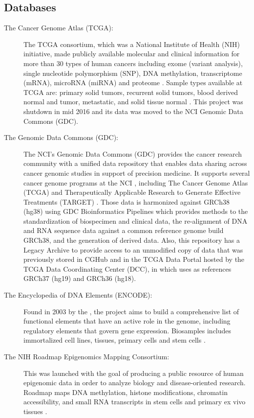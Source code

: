 \subsection{Databases} \label{susec:db}
\begin{description}
  \item [The Cancer Genome Atlas (TCGA):] The TCGA consortium, which was a National Institute of Health (NIH) initiative, made publicly available molecular and clinical information for more than 30 types of human cancers including exome (variant analysis), single nucleotide polymorphism (SNP), DNA methylation, transcriptome (mRNA), microRNA (miRNA) and proteome . Sample types available at TCGA are: primary solid tumors, recurrent solid tumors, blood derived normal and tumor, metastatic, and solid tissue normal \cite{weinstein2013cancer}. This project was shutdown in mid 2016 and its data was moved to  the NCI Genomic Data Commons (GDC).
  \item [The Genomic Data Commons (GDC):]  The NCI's Genomic Data Commons (GDC) provides the cancer research community with a unified data repository that enables data sharing across cancer genomic studies in support of precision medicine.
  It supports several cancer genome programs at the NCI , including The Cancer Genome Atlas (TCGA) and Therapeutically Applicable Research to Generate Effective Treatments (TARGET) \cite{GDC_web}.
  Those data is harmonized against GRCh38 (hg38) using GDC Bioinformatics Pipelines which provides methods to the standardization of biospecimen and clinical data, the re-alignment of DNA and RNA sequence data against a common reference genome build GRCh38, and the generation of derived data. Also, this repository has a Legacy Archive to provide access to an unmodified copy of data that was previously stored in CGHub \cite{wilks2014cancer} and in the TCGA Data Portal hosted by the TCGA Data Coordinating Center (DCC), in which uses as references GRCh37 (hg19) and GRCh36 (hg18).
  \item [The Encyclopedia of DNA Elements (ENCODE):] Found in 2003 by the , the project aims to build a comprehensive list of functional elements that have an active role in the genome, including regulatory elements that govern gene expression. Biosamples includes immortalized cell lines, tissues, primary cells and stem cells \cite{encode2011user}.
  \item [The NIH Roadmap Epigenomics Mapping Consortium:] This was launched with the goal of producing a public resource of human epigenomic data in order to analyze biology and disease-oriented research. Roadmap maps DNA methylation, histone modifications, chromatin accessibility, and small RNA transcripts in stem cells and primary ex vivo tissues
  \cite{Fingerman,Bernstein}.
\end{description}

